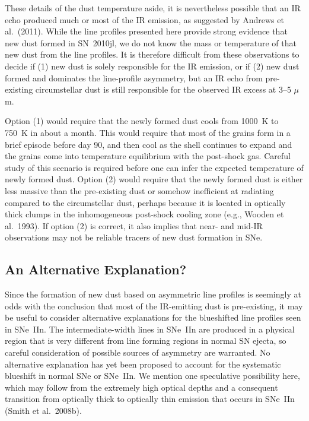 \documentclass{emulateapj}
\begin{document}
These details of the dust temperature aside, it is nevertheless
possible that an IR echo produced much or most of the IR emission, as
suggested by Andrews et al.\ (2011).  While the line profiles
presented here provide strong evidence that new dust formed in
SN~2010jl, we do not know the mass or temperature of that new dust
from the line profiles.  It is therefore difficult from these
observations to decide if (1) new dust is solely responsible for the IR
emission, or if (2) new dust formed and dominates the line-profile
asymmetry, but an IR echo from pre-existing circumstellar dust is
still responsible for the observed IR excess at 3--5 $\mu$m.

Option (1) would require that the newly formed dust cools from 1000~K
to 750~K in about a month.  This would require that most of the grains
form in a brief episode before day 90, and then cool as the shell
continues to expand and the grains come into temperature equilibrium
with the post-shock gas.  Careful study of this scenario is required
before one can infer the expected temperature of newly formed dust.
Option (2) would require that the newly formed dust is either less
massive than the pre-existing dust or somehow inefficient at radiating
compared to the circumstellar dust, perhaps because it is located in
optically thick clumps in the inhomogeneous post-shock cooling zone
(e.g., Wooden et al.\ 1993).  If option (2) is correct, it also
implies that near- and mid-IR observations may not be reliable tracers
of new dust formation in SNe.





\subsection{An Alternative Explanation?}

Since the formation of new dust based on asymmetric line
profiles is seemingly at odds with the conclusion that most of the
IR-emitting dust is pre-existing, it may be useful to consider
alternative explanations for the blueshifted line profiles seen in
SNe~IIn.  The intermediate-width lines in SNe~IIn are produced in a
physical region that is very different from line forming regions in
normal SN ejecta, so careful consideration of possible sources of
asymmetry are warranted.  No alternative explanation has yet been
proposed to account for the systematic blueshift in normal SNe or
SNe~IIn.  We mention one speculative possibility here, which may
follow from the extremely high optical depths and a consequent
transition from optically thick to optically thin emission that occurs
in SNe~IIn (Smith et al.\ 2008b).
\end{document}

